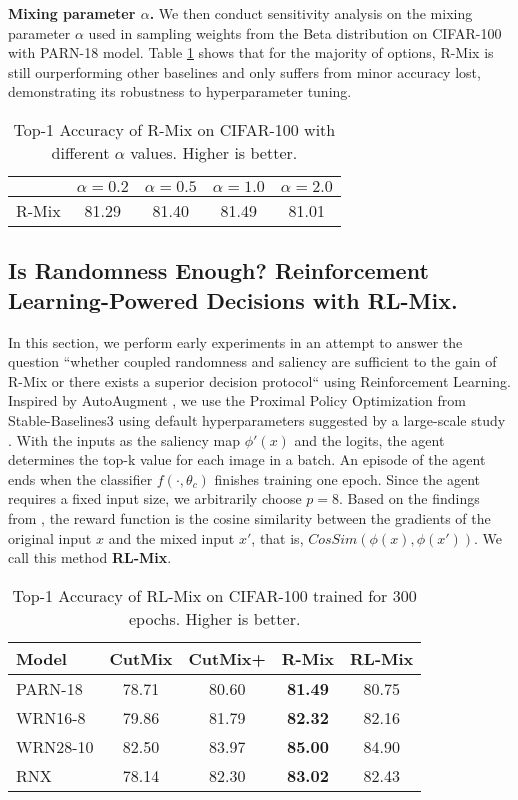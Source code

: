 \documentclass[letterpaper]{article} \usepackage[submission]{aaai23}  \usepackage{times}  \usepackage{helvet}  \usepackage{courier}  \usepackage[hyphens]{url}  \usepackage{graphicx} \urlstyle{rm} \def\UrlFont{\rm}  \usepackage{natbib}  \usepackage{caption} \frenchspacing  \setlength{\pdfpagewidth}{8.5in} \setlength{\pdfpageheight}{11in}
\newcommand{\rrlmix}{{R-Mix}}
\newcommand{\cifar}{CIFAR-100}
\begin{document}
\textbf{Mixing parameter $\alpha$.} We then conduct sensitivity analysis on the mixing parameter $\alpha$ used in sampling weights from the Beta distribution on CIFAR-100 with PARN-18 model. Table \ref{table:alpha} shows that for the majority of options, \rrlmix{} is still ourperforming other baselines and only suffers from minor accuracy lost, demonstrating its robustness to hyperparameter tuning.

\begin{table}[h!]
\centering
\begin{tabular}{lcccc}
\hline
 & $\alpha=0.2$ & $\alpha=0.5$ & $\alpha=1.0$ & $\alpha=2.0$ \\ \hline
R-Mix & 81.29 & 81.40 & 81.49 & 81.01 \\ \hline
\end{tabular}
\caption{Top-1 Accuracy of R-Mix on CIFAR-100 with different $\alpha$ values. Higher is better.}
\label{table:alpha}
\end{table}


\subsection{Is Randomness Enough? Reinforcement Learning-Powered Decisions with RL-Mix.}

In this section, we perform early experiments in an attempt to answer the question ``whether coupled randomness and saliency are sufficient to the gain of R-Mix or there exists a superior decision protocol`` using Reinforcement Learning. Inspired by AutoAugment \cite{Cubuk2019AutoAug}, we use the Proximal Policy Optimization \cite{schulman2017ppo} from Stable-Baselines3 \cite{stable-baselines3} using default hyperparameters suggested by a large-scale study \cite{andrychowicz2021whatmatter}. With the inputs as the saliency map $\phi'(x)$ and the logits, the agent determines the top-k value for each image in a batch. An episode of the agent ends when the classifier $f(\cdot, \theta_c)$ finishes training one epoch. Since the agent requires a fixed input size, we arbitrarily choose $p=8$. Based on the findings from \cite{zheng2022deep}, the reward function is the cosine similarity between the gradients of the original input $x$ and the mixed input $x'$, that is, $CosSim(\phi(x), \phi(x'))$. We call this method \textbf{RL-Mix}.

\begin{table}[h!]
  \centering
  \begin{tabular}{lcc|cc}
    \hline
    Model  & CutMix & CutMix+ & R-Mix & RL-Mix \\ \hline
    PARN-18  & 78.71 & 80.60 & \textbf{81.49} & 80.75 \\
    WRN16-8  & 79.86 & 81.79 & \textbf{82.32} & 82.16 \\
    WRN28-10  & 82.50 & 83.97 & \textbf{85.00} & 84.90 \\
    RNX & 78.14 & 82.30 & \textbf{83.02} & 82.43 \\ \hline
    \end{tabular}
  \caption{Top-1 Accuracy of RL-Mix on \cifar{} trained for 300 epochs. Higher is better.}
  \label{tab:results2}
\end{table}
\end{document}
